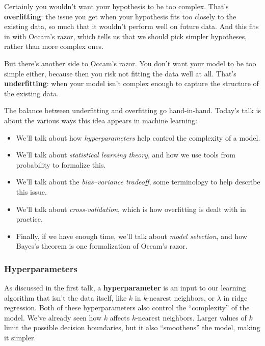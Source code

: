 \documentclass[11pt,paper=letter]{scrartcl}
\begin{document}
Certainly you wouldn't want your hypothesis to be too complex. That's \textbf{overfitting}: the issue you get when your hypothesis fits too closely to the existing data, so much that it wouldn't perform well on future data. And this fits in with Occam's razor, which tells us that we should pick simpler hypotheses, rather than more complex ones.

But there's another side to Occam's razor. You don't want your model to be too simple either, because then you risk not fitting the data well at all. That's \textbf{underfitting}: when your model isn't complex enough to capture the structure of the existing data.

The balance between underfitting and overfitting go hand-in-hand. Today's talk is about the various ways this idea appears in machine learning:
\begin{itemize}
  \item We'll talk about how \textit{hyperparameters} help control the complexity of a model.
  \item We'll talk about \textit{statistical learning theory}, and how we use tools from probability to formalize this.
  \item We'll talk about the \textit{bias--variance tradeoff}, some terminology to help describe this issue.
  \item We'll talk about \textit{cross-validation}, which is how overfitting is dealt with in practice.
  \item Finally, if we have enough time, we'll talk about \textit{model selection}, and how Bayes's theorem is one formalization of Occam's razor.
\end{itemize}

\subsubsection*{Hyperparameters}

As discussed in the first talk, a \textbf{hyperparameter} is an input to our learning algorithm that isn't the data itself, like $k$ in $k$-nearest neighbors, or $\lambda$ in ridge regression. Both of these hyperparameters also control the ``complexity'' of the model. We've already seen how $k$ affects $k$-nearest neighbors. Larger values of $k$ limit the possible decision boundaries, but it also ``smoothens'' the model, making it simpler.
\end{document}
